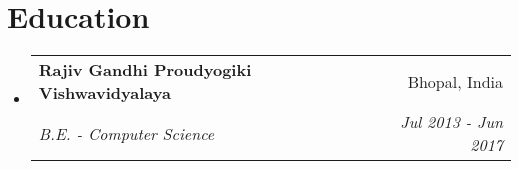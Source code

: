 \documentclass[letterpaper,12pt]{article}
\makeatletter
\newcommand{\resumeSubheading}[4]{
  \vspace{-2pt}\item
    \begin{tabular*}{0.97\textwidth}[t]{l@{\extracolsep{\fill}}r}
      \textbf{#1} & \small{#2} \\
      \textit{\small{#3}} & \textit{\small{#4}} \\
    \end{tabular*}\vspace{-5pt}
}
\newcommand{\resumeSubHeadingListStart}{\begin{itemize}[leftmargin=0.15in, label={}]}
\newcommand{\resumeSubHeadingListEnd}{\end{itemize}}
\def\myHometown{Bhopal, India}
\makeatother
\begin{document}


\section{Education}
\vspace{3pt}
\resumeSubHeadingListStart

\resumeSubheading
{Rajiv Gandhi Proudyogiki Vishwavidyalaya}{\myHometown}
{B.E. - Computer Science}{Jul 2013 - Jun 2017}

\resumeSubHeadingListEnd




\end{document}
